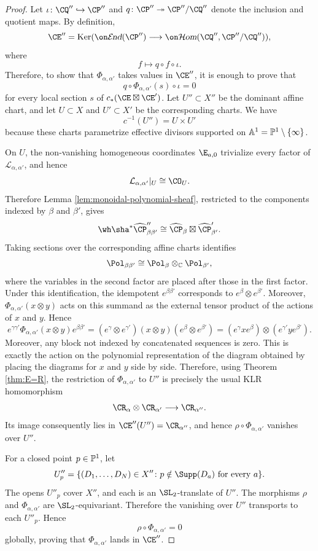 \documentclass[11pt,reqno]{amsart}
\begin{document}
\begin{proof}
    Let $\iota\colon\CQ''\hookrightarrow\CP''$ and $q\colon\CP''\twoheadrightarrow\CP''/\CQ''$ denote the inclusion and quotient maps. By definition, \[\CE''=\ker(\shend(\CP'')\longrightarrow\shom(\CQ'',\CP''/\CQ'')),\]where \[f\longmapsto q\circ f\circ\iota.\] Therefore, to show that $\Phi_{\alpha,\alpha'}$ takes values in $\CE''$, it is enough to prove that\[q\circ\Phi_{\alpha,\alpha'}(s)\circ\iota=0\]
for every local section $s$ of $c_*(\CE\boxtimes\CE')$.
Let $U''\subset X''$ be the dominant affine chart, and let $U\subset X$ and $U'\subset X'$ be the corresponding charts. We have
\[c^{-1}(U'')=U\times U'\] because these charts parametrize effective divisors supported on $\mathbb A^1=\mathbb P^1\setminus\{\infty\}$.

On $U$, the non-vanishing homogeneous coordinates $\E_{a,0}$ trivialize every factor of $\mathcal L_{\alpha,\alpha'}$, and hence
\[\mathcal L_{\alpha,\alpha'}|_U\cong\CO_U.\] Therefore Lemma \ref{lem:monoidal-polynomial-sheaf}, restricted to the
components indexed by $\beta$ and $\beta'$, gives
\[\wh\sha^*\widehat\CP''_{\beta\beta'}\cong\widehat\CP_\beta\boxtimes\widehat\CP'_{\beta'}.
\]
Taking sections over the corresponding affine charts identifies
\[\Pol_{\beta\beta'}\cong\Pol_\beta\otimes_{\BC}\Pol_{\beta'},\]
where the variables in the second factor are placed after those in the first factor.  Under this identification, the idempotent $e^{\beta\beta'}$ corresponds to $e^\beta\otimes e^{\beta'}.$ Moreover,
$\Phi_{\alpha,\alpha'}(x\otimes y)$ acts on this summand as the
external tensor product of the actions of $x$ and $y$.  Hence
\[e^{\gamma\gamma'}\Phi_{\alpha,\alpha'}(x\otimes y)e^{\beta\beta'}=
(e^\gamma\otimes e^{\gamma'})(x\otimes y)
(e^\beta\otimes e^{\beta'})=(e^\gamma x e^\beta)\otimes(e^{\gamma'}ye^{\beta'}).\] Moreover, any block not indexed by
concatenated sequences is zero. This is exactly the action on the
polynomial representation of the diagram obtained by placing the
diagrams for $x$ and $y$ side by side.  Therefore, using Theorem
\ref{thm:E=R}, the restriction of $\Phi_{\alpha,\alpha'}$ to $U''$
is precisely the usual KLR homomorphism
\[\CR_\alpha\otimes\CR_{\alpha'}\longrightarrow\CR_{\alpha''}.\]
Its image consequently lies in
$\CE''(U'')=\CR_{\alpha''}$, and hence
$\rho\circ\Phi_{\alpha,\alpha'}$ vanishes over $U''.$

For a closed point $p\in\mathbb P^1$, let
\[U''_p=\{(D_1,\ldots,D_N)\in X''\colon p\notin\Supp(D_a)\text{ for every }a\}.\]The opens $U''_p$ cover $X''$, and each is an $\SL_2$-translate of $U''$. The morphisms $\rho$ and $\Phi_{\alpha,\alpha'}$ are $\SL_2$-equivariant. Therefore the vanishing over $U''$ transports to each $U''_p$. Hence \[\rho\circ\Phi_{\alpha,\alpha'}=0\] globally, proving that $\Phi_{\alpha,\alpha'}$ lands in $\CE''$.


\end{proof}
\end{document}
